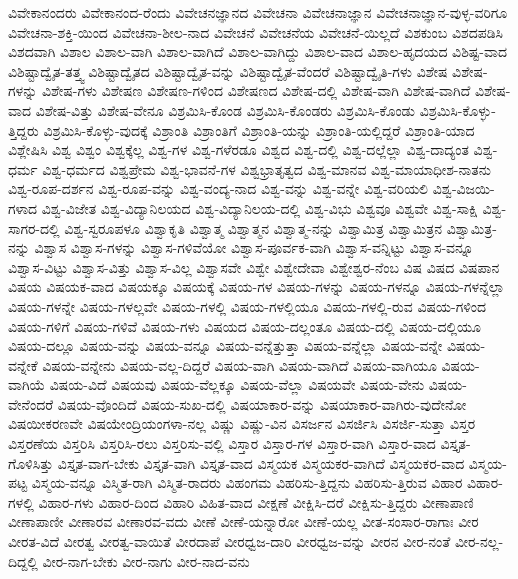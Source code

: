 {ವಿವೇಕಾನಂದರು
ವಿವೇಕಾನಂದ-ರೆಂದು
ವಿವೇಚನಜ್ಞಾನದ
ವಿವೇಚನಾ
ವಿವೇಚನಾಜ್ಞಾನ
ವಿವೇಚನಾಜ್ಞಾನ-ವುಳ್ಳ-ವರಿಗೂ
ವಿವೇಚನಾ-ಶಕ್ತಿ-ಯಿಂದ
ವಿವೇಚನಾ-ಶೀಲ-ನಾದ
ವಿವೇಚನೆ
ವಿವೇಚನೆಯ
ವಿವೇಚನೆ-ಯಿಲ್ಲದೆ
ವಿಶಕುಂಬ
ವಿಶದಪಡಿಸಿ
ವಿಶದವಾಗಿ
ವಿಶಾಲ
ವಿಶಾಲ-ವಾಗಿ
ವಿಶಾಲ-ವಾಗಿದೆ
ವಿಶಾಲ-ವಾಗಿದ್ದು
ವಿಶಾಲ-ವಾದ
ವಿಶಾಲ-ಹೃದಯದ
ವಿಶಿಷ್ಟ-ವಾದ
ವಿಶಿಷ್ಟಾದ್ವೈತ-ತತ್ತ್ವ
ವಿಶಿಷ್ಟಾದ್ವೈತದ
ವಿಶಿಷ್ಟಾದ್ವೈತ-ವನ್ನು
ವಿಶಿಷ್ಟಾದ್ವೈತ-ವೆಂದರೆ
ವಿಶಿಷ್ಟಾದ್ವೈತಿ-ಗಳು
ವಿಶೇಷ
ವಿಶೇಷ-ಗಳನ್ನು
ವಿಶೇಷ-ಗಳು
ವಿಶೇಷಣ
ವಿಶೇಷಣ-ಗಳಿಂದ
ವಿಶೇಷಣದ
ವಿಶೇಷ-ದಲ್ಲಿ
ವಿಶೇಷ-ವಾಗಿ
ವಿಶೇಷ-ವಾಗಿದೆ
ವಿಶೇಷ-ವಾದ
ವಿಶೇಷ-ವಿತ್ತು
ವಿಶೇಷ-ವೇನೂ
ವಿಶ್ರಮಿಸಿ-ಕೊಂಡ
ವಿಶ್ರಮಿಸಿ-ಕೊಂಡರು
ವಿಶ್ರಮಿಸಿ-ಕೊಂಡು
ವಿಶ್ರಮಿಸಿ-ಕೊಳ್ಳು-ತ್ತಿದ್ದರು
ವಿಶ್ರಮಿಸಿ-ಕೊಳ್ಳು-ವುದಕ್ಕೆ
ವಿಶ್ರಾಂತಿ
ವಿಶ್ರಾಂತಿಗೆ
ವಿಶ್ರಾಂತಿ-ಯನ್ನು
ವಿಶ್ರಾಂತಿ-ಯಲ್ಲಿದ್ದರೆ
ವಿಶ್ರಾಂತಿ-ಯಾದ
ವಿಶ್ಲೇಷಿಸಿ
ವಿಶ್ವ
ವಿಶ್ವಂ
ವಿಶ್ವಕ್ಕೆಲ್ಲ
ವಿಶ್ವ-ಗಳ
ವಿಶ್ವ-ಗಳೆರಡೂ
ವಿಶ್ವದ
ವಿಶ್ವ-ದಲ್ಲಿ
ವಿಶ್ವ-ದಲ್ಲೆಲ್ಲಾ
ವಿಶ್ವ-ದಾದ್ಯಂತ
ವಿಶ್ವ-ಧರ್ಮ
ವಿಶ್ವ-ಧರ್ಮದ
ವಿಶ್ವಪ್ರೇಮ
ವಿಶ್ವ-ಭಾವನೆ-ಗಳ
ವಿಶ್ವಭ್ರಾತೃತ್ವದ
ವಿಶ್ವ-ಮಾನವ
ವಿಶ್ವ-ಮಾಯಾಧೀಶ-ನಾತನು
ವಿಶ್ವ-ರೂಪ-ದರ್ಶನ
ವಿಶ್ವ-ರೂಪ-ವನ್ನು
ವಿಶ್ವ-ವಂದ್ಯ-ನಾದ
ವಿಶ್ವ-ವನ್ನು
ವಿಶ್ವ-ವನ್ನೇ
ವಿಶ್ವ-ವರಿಯಲಿ
ವಿಶ್ವ-ವಿಜಯಿ-ಗಳಾದ
ವಿಶ್ವ-ವಿಜೇತ
ವಿಶ್ವ-ವಿದ್ಯಾನಿಲಯದ
ವಿಶ್ವ-ವಿದ್ಯಾನಿಲಯ-ದಲ್ಲಿ
ವಿಶ್ವ-ವಿಭು
ವಿಶ್ವವೂ
ವಿಶ್ವವೇ
ವಿಶ್ವ-ಸಾಕ್ಷಿ
ವಿಶ್ವ-ಸಾಗರ-ದಲ್ಲಿ
ವಿಶ್ವ-ಸ್ವರೂಪಳೂ
ವಿಶ್ವಾಕೃತಿ
ವಿಶ್ವಾತ್ಮ
ವಿಶ್ವಾತ್ಮನ
ವಿಶ್ವಾತ್ಮ-ನನ್ನು
ವಿಶ್ವಾಮಿತ್ರ
ವಿಶ್ವಾಮಿತ್ರನ
ವಿಶ್ವಾಮಿತ್ರ-ನನ್ನು
ವಿಶ್ವಾಸ
ವಿಶ್ವಾಸ-ಗಳನ್ನು
ವಿಶ್ವಾಸ-ಗಳಿವೆಯೋ
ವಿಶ್ವಾಸ-ಪೂರ್ವಕ-ವಾಗಿ
ವಿಶ್ವಾಸ-ವನ್ನಿಟ್ಟು
ವಿಶ್ವಾಸ-ವನ್ನೂ
ವಿಶ್ವಾಸ-ವಿಟ್ಟು
ವಿಶ್ವಾಸ-ವಿತ್ತು
ವಿಶ್ವಾಸ-ವಿಲ್ಲ
ವಿಶ್ವಾಸವೇ
ವಿಶ್ವೇ
ವಿಶ್ವೇದೇವಾ
ವಿಶ್ವೇಶ್ವರ-ನೆಂಬ
ವಿಷ
ವಿಷದ
ವಿಷಪಾನ
ವಿಷಯ
ವಿಷಯಕ-ವಾದ
ವಿಷಯಕ್ಕೂ
ವಿಷಯಕ್ಕೆ
ವಿಷಯ-ಗಳ
ವಿಷಯ-ಗಳನ್ನು
ವಿಷಯ-ಗಳನ್ನೂ
ವಿಷಯ-ಗಳನ್ನೆಲ್ಲಾ
ವಿಷಯ-ಗಳನ್ನೇ
ವಿಷಯ-ಗಳಲ್ಲವೇ
ವಿಷಯ-ಗಳಲ್ಲಿ
ವಿಷಯ-ಗಳಲ್ಲಿಯೂ
ವಿಷಯ-ಗಳಲ್ಲಿ-ರುವ
ವಿಷಯ-ಗಳಿಂದ
ವಿಷಯ-ಗಳಿಗೆ
ವಿಷಯ-ಗಳಿವೆ
ವಿಷಯ-ಗಳು
ವಿಷಯದ
ವಿಷಯ-ದಲ್ಲಂತೂ
ವಿಷಯ-ದಲ್ಲಿ
ವಿಷಯ-ದಲ್ಲಿಯೂ
ವಿಷಯ-ದಲ್ಲೂ
ವಿಷಯ-ವನ್ನು
ವಿಷಯ-ವನ್ನೂ
ವಿಷಯ-ವನ್ನೆತ್ತುತ್ತಾ
ವಿಷಯ-ವನ್ನೆಲ್ಲಾ
ವಿಷಯ-ವನ್ನೇ
ವಿಷಯ-ವನ್ನೇಕೆ
ವಿಷಯ-ವನ್ನೇನು
ವಿಷಯ-ವಲ್ಲ-ದಿದ್ದರೆ
ವಿಷಯ-ವಾಗಿ
ವಿಷಯ-ವಾಗಿದೆ
ವಿಷಯ-ವಾಗಿಯೂ
ವಿಷಯ-ವಾಗಿಯೆ
ವಿಷಯ-ವಿದೆ
ವಿಷಯವು
ವಿಷಯ-ವೆಲ್ಲಕ್ಕೂ
ವಿಷಯ-ವೆಲ್ಲಾ
ವಿಷಯವೇ
ವಿಷಯ-ವೇನು
ವಿಷಯ-ವೇನೆಂದರೆ
ವಿಷಯ-ವೊಂದಿದೆ
ವಿಷಯ-ಸುಖ-ದಲ್ಲಿ
ವಿಷಯಾಕಾರ-ವನ್ನು
ವಿಷಯಾಕಾರ-ವಾಗಿರು-ವುದೇನೋ
ವಿಷಯೀಕರಣವೇ
ವಿಷಯೇಂದ್ರಿಯಂಗಳಾ-ನಲ್ಲ
ವಿಷ್ಣು
ವಿಷ್ಣು-ವಿನ
ವಿಸರ್ಜನ
ವಿಸರ್ಜಿಸಿ
ವಿಸರ್ಜಿ-ಸುತ್ತಾ
ವಿಸ್ತರ
ವಿಸ್ತರಣೆಯ
ವಿಸ್ತರಿಸಿ
ವಿಸ್ತರಿಸಿ-ರಲು
ವಿಸ್ತರಿಸು-ವಲ್ಲಿ
ವಿಸ್ತಾರ
ವಿಸ್ತಾರ-ಗಳ
ವಿಸ್ತಾರ-ವಾಗಿ
ವಿಸ್ತಾರ-ವಾದ
ವಿಸ್ತೃತ-ಗೊಳಿಸಿತ್ತು
ವಿಸ್ತೃತ-ವಾಗ-ಬೇಕು
ವಿಸ್ತೃತ-ವಾಗಿ
ವಿಸ್ತೃತ-ವಾದ
ವಿಸ್ಮಯಕ
ವಿಸ್ಮಯಕರ-ವಾಗಿದೆ
ವಿಸ್ಮಯಕರ-ವಾದ
ವಿಸ್ಮಯ-ಪಟ್ಟ
ವಿಸ್ಮಯ-ವನ್ನೂ
ವಿಸ್ಮಿತ-ರಾಗಿ
ವಿಸ್ಮಿತ-ರಾದರು
ವಿಹಂಗಮ
ವಿಹರಿಸು-ತ್ತಿದ್ದನು
ವಿಹರಿಸು-ತ್ತಿರುವ
ವಿಹಾರ
ವಿಹಾರ-ಗಳಲ್ಲಿ
ವಿಹಾರ-ಗಳು
ವಿಹಾರ-ದಿಂದ
ವಿಹಾರಿ
ವಿಹಿತ-ವಾದ
ವೀಕ್ಷಣೆ
ವೀಕ್ಷಿಸಿ-ದರೆ
ವೀಕ್ಷಿಸು-ತ್ತಿದ್ದರು
ವೀಣಾಪಾಣಿ
ವೀಣಾಪಾಣೀ
ವೀಣಾರವ
ವೀಣಾರವ-ವದು
ವೀಣೆ
ವೀಣೆ-ಯನ್ನಾರೋ
ವೀಣೆ-ಯಲ್ಲ
ವೀತ-ಸಂಸಾರ-ರಾಗಾಃ
ವೀರ
ವೀರತ-ವಿದೆ
ವೀರತ್ವ
ವೀರತ್ವ-ವಾಯಿತೆ
ವೀರದಾಪೆ
ವೀರಧ್ವಜ-ದಾರಿ
ವೀರಧ್ವಜ-ವನ್ನು
ವೀರನ
ವೀರ-ನಂತೆ
ವೀರ-ನಲ್ಲ-ದಿದ್ದಲ್ಲಿ
ವೀರ-ನಾಗ-ಬೇಕು
ವೀರ-ನಾಗು
ವೀರ-ನಾದ-ವನು
}
